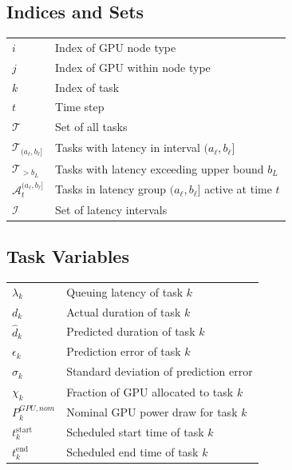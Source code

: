 \documentclass[preprint,12pt]{elsarticle}
\begin{document}
\subsection*{Indices and Sets}
\begin{tabular}{ll}
$i$ & Index of GPU node type \\
$j$ & Index of GPU within node type \\
$k$ & Index of task \\
$t$ & Time step \\
$\mathcal{T}$ & Set of all tasks \\
$\mathcal{T}_{(a_\ell, b_\ell]}$ & Tasks with latency in interval $(a_\ell, b_\ell]$ \\
$\mathcal{T}_{>b_L}$ & Tasks with latency exceeding upper bound $b_L$ \\
$\mathcal{A}_t^{(a_\ell, b_\ell]}$ & Tasks in latency group $(a_\ell, b_\ell]$ active at time $t$ \\
$\mathcal{I}$ & Set of latency intervals \\
\end{tabular}

\vspace{1em}

\subsection*{Task Variables}
\begin{tabular}{ll}
$\lambda_k$ & Queuing latency of task $k$ \\
$d_k$ & Actual duration of task $k$ \\
$\hat{d}_k$ & Predicted duration of task $k$ \\
$\epsilon_k$ & Prediction error of task $k$ \\
$\sigma_k$ & Standard deviation of prediction error  \\
$\chi_k$ & Fraction of GPU allocated to task $k$ \\
$P^{GPU,nom}_k$ & Nominal GPU power draw for task $k$ \\
$t_k^{\text{start}}$ & Scheduled start time of task $k$ \\
$t_k^{\text{end}}$ & Scheduled end time of task $k$ \\
\end{tabular}

\vspace{1em}
\end{document}

